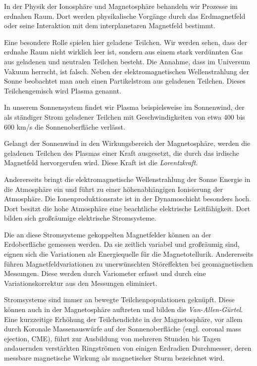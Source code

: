 \documentclass[
  a4paper,
  DIV=11]{scrreprt}
\begin{document}
In der Physik der Ionosphäre und Magnetosphäre behandeln wir Prozesse im
erdnahen Raum. Dort werden physikalische Vorgänge durch das
Erdmagnetfeld oder seine Interaktion mit dem interplanetaren Magnetfeld
bestimmt.

Eine besondere Rolle spielen hier geladene Teilchen. Wir werden sehen,
dass der erdnahe Raum nicht wirklich leer ist, sondern aus einem stark
verdünnten Gas aus geladenen und neutralen Teilchen besteht. Die
Annahme, dass im Universum Vakuum herrscht, ist falsch. Neben der
elektromagnetischen Wellenstrahlung der Sonne beobachtet man auch einen
Partikelstrom aus geladenen Teilchen. Dieses Teilchengemisch wird Plasma
genannt.

In unserem Sonnensystem findet wir Plasma beispielsweise im Sonnenwind,
der als ständiger Strom geladener Teilchen mit Geschwindigkeiten von
etwa 400 bis 600 km/s die Sonnenoberfläche verlässt.

Gelangt der Sonnenwind in den Wirkungsbereich der Magnetosphäre, werden
die geladenen Teilchen des Plasmas einer Kraft ausgesetzt, die durch das
irdische Magnetfeld hervorgerufen wird. Diese Kraft ist die
\emph{Lorentzkraft}.

Andererseits bringt die elektromagnetische Wellenstrahlung der Sonne
Energie in die Atmosphäre ein und führt zu einer höhenabhängigen
Ionisierung der Atmosphäre. Die Ionenproduktionsrate ist in der
Dynamoschicht besonders hoch. Dort besitzt die hohe Atmosphäre eine
beachtliche elektrische Leitfähigkeit. Dort bilden sich großräumige
elektrische Stromsysteme.

Die an diese Stromsysteme gekoppelten Magnetfelder können an der
Erdoberfläche gemessen werden. Da sie zeitlich variabel und großräumig
sind, eignen sich die Variationen als Energiequelle für die
Magnetotellurik. Andererseits führen Magnetfeldvariationen zu
unerwünschten Störeffekten bei geomagnetischen Messungen. Diese werden
durch Variometer erfasst und durch eine Variationskorrektur aus den
Messungen eliminiert.

Stromsysteme sind immer an bewegte Teilchenpopulationen geknüpft. Diese
können auch in der Magnetosphäre auftreten und bilden die
\emph{Van-Allen-Gürtel}. Eine kurzzeitige Erhöhung der Teilchendichte in
der Magnetosphäre, vor allem durch Koronale Massenauswürfe auf der
Sonnenoberfläche (engl. coronal mass ejection, CME), führt zur
Ausbildung von mehreren Stunden bis Tagen andauernden verstärkten
Ringströmen von einigen Erdradien Durchmesser, deren messbare
magnetische Wirkung als magnetischer Sturm bezeichnet wird.
\end{document}

